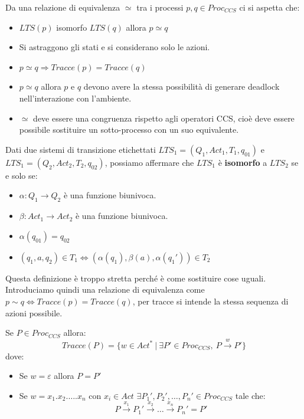 Da una relazione di equivalenza $\simeq$ tra i processi $p, q \in Proc_{CCS}$ ci
si aspetta che:
\begin{itemize}
    \item $LTS(p)$ isomorfo $LTS(q)$ allora $p \simeq q$
    \item Si astraggono gli stati e si considerano solo le azioni.
    \item $p \simeq q \Rightarrow Tracce(p) = Tracce(q)$
    \item $p \simeq q$ allora $p$ e $q$ devono avere la stessa possibilità di
          generare deadlock nell'interazione con l'ambiente.
    \item $\simeq$ deve essere una congruenza rispetto agli operatori CCS, cioè
          deve essere possibile sostituire un sotto-processo con un suo equivalente.
\end{itemize}
\begin{definizione}
    Dati due sistemi di transizione etichettati $LTS_1 = (Q_1, Act_1, T_1, q_{01})$
    e $LTS_1 = (Q_2, Act_2, T_2, q_{02})$, possiamo affermare che
    $LTS_1$ è \textbf{isomorfo} a $LTS_2$ se e solo se:
    \begin{itemize}
        \item $\alpha: Q_1 \to Q_2$ è una funzione biunivoca.
        \item $\beta: Act_1 \to Act_2$ è una funzione biunivoca.
        \item $\alpha(q_{01}) = q_{02}$
        \item $(q_1, a, q_2) \in T_1 \iff (\alpha(q_1), \beta(a), \alpha(q_1'))
                  \in T_2$
    \end{itemize}
\end{definizione}
Questa definizione è troppo stretta perché è come sostituire cose uguali.
Introduciamo quindi una relazione di equivalenza come $p \sim q \iff Tracce(p) =
    Tracce(q)$, per tracce si intende la stessa sequenza di azioni possibile.
\begin{definizione}
    Se $P \in Proc_{CCS}$ allora:
    \begin{equation}
        Tracce(P) = \{w \in Act^* \ | \ \exists P' \in Proc_{CCS}, \
        P \xrightarrow{w} P'\}
    \end{equation}
    dove:
    \begin{itemize}
        \item Se $w = \varepsilon$ allora $P =  P'$
        \item Se $w = x_1 . x_2 . \dots . x_n$ con $x_i \in Act$
              $\exists P_1', P_2', \dots, P_n' \in Proc_{CCS}$ tale che:
              \begin{equation}
                  P \xrightarrow{x_1} P_1' \xrightarrow{x_2} \dots
                  \xrightarrow{x_n} P_n' = P'
              \end{equation}
    \end{itemize}
\end{definizione}
